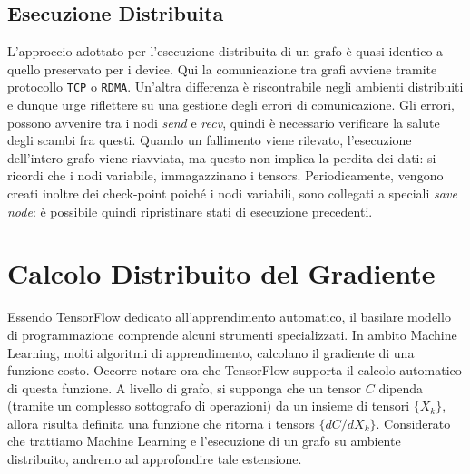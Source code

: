 \documentclass[DIV=calc, paper=a4, fontsize=11pt]{scrartcl}	 %
\begin{document}
\begin{multicols}{2}
			\subsection{Esecuzione Distribuita}
				L'approccio adottato per l'esecuzione distribuita di un grafo è quasi identico a quello preservato per i device. Qui la comunicazione tra grafi avviene tramite protocollo \texttt{TCP} o \texttt{RDMA}. Un'altra differenza è riscontrabile negli ambienti distribuiti e dunque urge riflettere su una gestione degli errori di comunicazione. Gli errori, possono avvenire tra i nodi \textit{send} e \textit{recv}, quindi è necessario verificare la salute degli scambi fra questi. Quando un fallimento viene rilevato, l'esecuzione dell'intero grafo viene riavviata, ma questo non implica la perdita dei dati: si ricordi che i nodi variabile, immagazzinano i tensors. Periodicamente, vengono creati inoltre dei check-point poiché i nodi variabili, sono collegati a speciali \textit{save node}: è possibile quindi ripristinare stati di esecuzione precedenti.
		\section{Calcolo Distribuito del Gradiente}
			Essendo TensorFlow dedicato all'apprendimento automatico, il basilare modello di programmazione comprende alcuni strumenti specializzati. In ambito Machine Learning, molti algoritmi di apprendimento, calcolano il gradiente di una funzione costo. Occorre notare ora che TensorFlow supporta il calcolo automatico di questa funzione. A livello di grafo, si supponga che un tensor $C$ dipenda (tramite un complesso sottografo di operazioni) da un insieme di tensori $\{X_k\}$, allora risulta definita una funzione che ritorna i tensors $\{dC/dX_k\}$. Considerato che trattiamo Machine Learning e l'esecuzione di un grafo su ambiente distribuito, andremo ad approfondire tale estensione.
			

\end{multicols}
\end{document}
